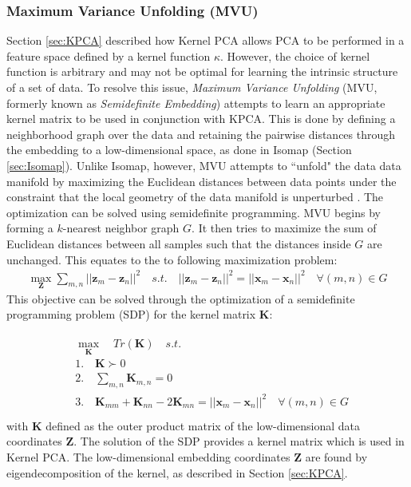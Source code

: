 \subsubsection{Maximum Variance Unfolding (MVU)} \label{sec:MVU}
Section \ref{sec:KPCA} described how Kernel PCA \citep{Scholkopf1999KPCA,Wang2014KPCAReview} allows PCA to be performed in a feature space defined by a kernel function $\kappa$.  However, the choice of kernel function is arbitrary and may not be optimal for learning the intrinsic structure of a set of data.  To resolve this issue, \textit{Maximum Variance Unfolding} (MVU, formerly known as \textit{Semidefinite Embedding})\citep{Weinberger2004MVU} attempts to learn an appropriate kernel matrix to be used in conjunction with KPCA.  This is done by defining a neighborhood graph over the data and retaining the pairwise distances through the embedding to a low-dimensional space, as done in Isomap (Section \ref{sec:Isomap}).  Unlike Isomap, however, MVU attempts to ``unfold" the data data manifold by maximizing the Euclidean distances between data points under the constraint that the local geometry of the data manifold is unperturbed \citep{VanDerMaaten2009DRReview}.  The optimization can be solved using semidefinite programming.  MVU begins by forming a $k$-nearest neighbor graph $G$.  It then tries to maximize the sum of Euclidean distances between all samples such that the distances inside $G$ are unchanged.  This equates to the to following maximization problem:
\begin{align}
	\max_{\bm{Z}} \sum_{m,n} ||\bm{z}_{m} - \bm{z}_{n} ||^{2} \quad s.t. \quad ||\bm{z}_{m} - \bm{z}_{n} ||^{2} = ||\bm{x}_{m} - \bm{x}_{n} ||^{2} \quad \forall (m,n) \in G
\end{align}
\noindent
This objective can be solved through the optimization of a semidefinite programming problem (SDP) for the kernel matrix $\bm{K}$:

\begin{align}
	\begin{split}
		&\max_{\bm{K}} \quad Tr(\bm{K}) \quad s.t.\\
		&1. \quad \bm{K} \succ 0\\
		&2. \quad \sum_{m,n} \bm{K}_{m,n}=0\\
		&3. \quad \bm{K}_{mm} + \bm{K}_{nn} - 2\bm{K}_{mn} = ||\bm{x}_{m} - \bm{x}_{n} ||^{2} \quad \forall (m,n) \in G\\
	\end{split}
\end{align}
\noindent
with $\bm{K}$ defined as the outer product matrix of the low-dimensional data coordinates $\bm{Z}$.  The solution of the SDP provides a kernel matrix which is used in Kernel PCA.  The low-dimensional embedding coordinates $\bm{Z}$ are found by eigendecomposition of the kernel, as described in Section \ref{sec:KPCA}. 


